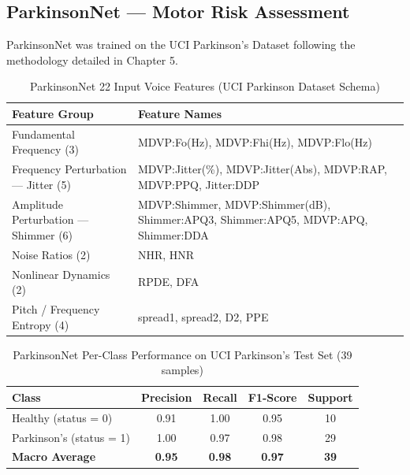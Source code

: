 \subsection{ParkinsonNet — Motor Risk Assessment}

ParkinsonNet was trained on the UCI Parkinson's Dataset following the methodology detailed in Chapter 5.

\begin{table}[h!]
\centering
\caption[ParkinsonNet 22 Input Voice Features]{ParkinsonNet 22 Input Voice Features (UCI Parkinson Dataset Schema)}
\renewcommand{\arraystretch}{1.3}
\begin{tabular}{|l|>{\raggedright\arraybackslash}p{8cm}|}
\hline
\textbf{Feature Group} & \textbf{Feature Names} \\
\hline
Fundamental Frequency (3) & MDVP:Fo(Hz), MDVP:Fhi(Hz), MDVP:Flo(Hz) \\
Frequency Perturbation — Jitter (5) & MDVP:Jitter(\%), MDVP:Jitter(Abs), MDVP:RAP, MDVP:PPQ, Jitter:DDP \\
Amplitude Perturbation — Shimmer (6) & MDVP:Shimmer, MDVP:Shimmer(dB), Shimmer:APQ3, Shimmer:APQ5, MDVP:APQ, Shimmer:DDA \\
Noise Ratios (2) & NHR, HNR \\
Nonlinear Dynamics (2) & RPDE, DFA \\
Pitch / Frequency Entropy (4) & spread1, spread2, D2, PPE \\
\hline
\end{tabular}
\end{table}

\begin{table}[h!]
\centering
\caption[ParkinsonNet Per-Class Performance]{ParkinsonNet Per-Class Performance on UCI Parkinson's Test Set (39 samples)}
\renewcommand{\arraystretch}{1.3}
\begin{tabular}{|l|c|c|c|c|}
\hline
\textbf{Class} & \textbf{Precision} & \textbf{Recall} & \textbf{F1-Score} & \textbf{Support} \\
\hline
Healthy (status = 0)      & 0.91 & 1.00 & 0.95 & 10 \\
Parkinson's (status = 1)  & 1.00 & 0.97 & 0.98 & 29 \\
\hline
\textbf{Macro Average}    & \textbf{0.95} & \textbf{0.98} & \textbf{0.97} & \textbf{39} \\
\hline
\end{tabular}
\end{table}

